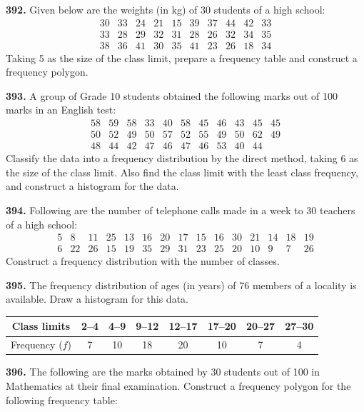 \documentclass[11pt]{article}
\begin{document}
\bigskip
\noindent\textbf{392.} Given below are the weights (in kg) of 30 students of a high school:
\[
\begin{array}{cccccccccc}
30 & 33 & 24 & 21 & 15 & 39 & 37 & 44 & 42 & 33 \\
33 & 28 & 29 & 32 & 31 & 28 & 26 & 32 & 34 & 35 \\
38 & 36 & 41 & 30 & 35 & 41 & 23 & 26 & 18 & 34
\end{array}
\]
Taking 5 as the size of the class limit, prepare a frequency table and construct a frequency polygon.

\bigskip
\noindent\textbf{393.} A group of Grade 10 students obtained the following marks out of 100 marks in an English test:
\[
\begin{array}{cccccccccccc}
58 & 59 & 58 & 33 & 40 & 58 & 45 & 46 & 43 & 45 & 45 \\
50 & 52 & 49 & 50 & 57 & 52 & 55 & 49 & 50 & 62 & 49 \\
48 & 44 & 42 & 47 & 46 & 47 & 46 & 53 & 40 & 44 &
\end{array}
\]
Classify the data into a frequency distribution by the direct method, taking 6 as the size of the class limit. Also find the class limit with the least class frequency, and construct a histogram for the data.

\bigskip
\noindent\textbf{394.} Following are the number of telephone calls made in a week to 30 teachers of a high school:
\[
\begin{array}{cccccccccccccccc}
5 & 8 & 11 & 25 & 13 & 16 & 20 & 17 & 15 & 16 & 30 & 21 & 14 & 18 & 19 \\
6 & 22 & 26 & 15 & 19 & 35 & 29 & 31 & 23 & 25 & 20 & 10 & 9 & 7 & 26
\end{array}
\]
Construct a frequency distribution with the number of classes.

\bigskip
\noindent\textbf{395.} The frequency distribution of ages (in years) of 76 members of a locality is available. Draw a histogram for this data.

\begin{center}
\begin{tabular}{|c|c|c|c|c|c|c|c|}
\hline
Class limits & 2--4 & 4--9 & 9--12 & 12--17 & 17--20 & 20--27 & 27--30 \\
\hline
Frequency ($f$) & 7 & 10 & 18 & 20 & 10 & 7 & 4 \\
\hline
\end{tabular}
\end{center}

\bigskip
\noindent\textbf{396.} The following are the marks obtained by 30 students out of 100 in Mathematics at their final examination. Construct a frequency polygon for the following frequency table:
\end{document}
